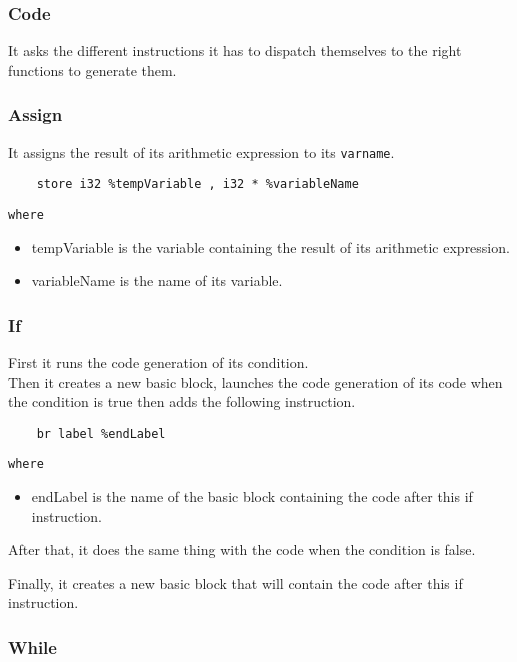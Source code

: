 \documentclass{article}
\begin{document}
\subsubsection{Code}
It asks the different instructions it has to dispatch themselves to the right functions to generate them.

\subsubsection{Assign}
It assigns the result of its arithmetic expression to its \texttt{varname}.

\begin{lstlisting}
    store i32 %tempVariable , i32 * %variableName
\end{lstlisting}

\noindent\texttt{where}

\begin{itemize}
    \item tempVariable is the variable containing the result of its arithmetic expression.
    \item variableName is the name of its variable.
\end{itemize}

\subsubsection{If}

First it runs the code generation of its condition.\\

Then it creates a new basic block, launches the code generation of its code when the condition is true then adds the following instruction.

\begin{lstlisting}
    br label %endLabel
\end{lstlisting}

\noindent\texttt{where}

\begin{itemize}
    \item endLabel is the name of the basic block containing the code after this if instruction.
\end{itemize}

After that, it does the same thing with the code when the condition is false.

Finally, it creates a new basic block that will contain the code after this if instruction.

\subsubsection{While}
\end{document}
